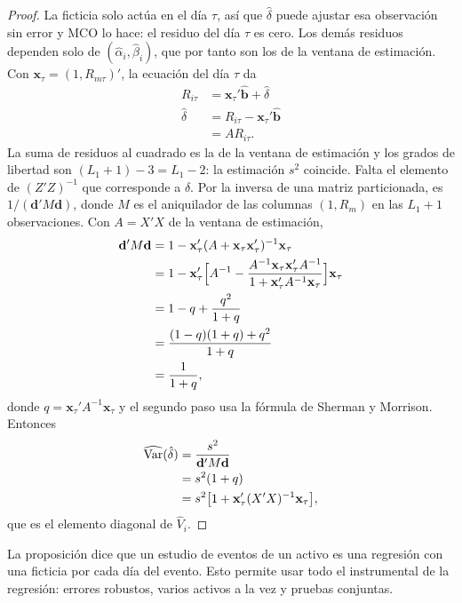 \begin{proof}
La ficticia solo actúa en el día $\tau$, así que $\hat\delta$ puede ajustar esa observación sin error y MCO lo hace: el
residuo del día $\tau$ es cero. Los demás residuos dependen solo de $(\hat\alpha_i,\hat\beta_i)$, que por tanto son los de la ventana
de estimación. Con $\mathbf x_\tau=(1,R_{m\tau})'$, la ecuación del día $\tau$ da
\begin{align*}
  R_{i\tau} &= \mathbf x_\tau'\hat{\mathbf b}+\hat\delta\\
  \hat\delta  &= R_{i\tau}-\mathbf x_\tau'\hat{\mathbf b}\\
             &= AR_{i\tau}.
\end{align*}
La suma de residuos al cuadrado es la de la ventana de estimación y los grados de libertad son $(L_1+1)-3=L_1-2$: la
estimación $s^2$ coincide. Falta el elemento de $(Z'Z)^{-1}$ que corresponde a $\delta$. Por la inversa de una matriz
particionada, es $1/(\mathbf d'M\mathbf d)$, donde $M$ es el aniquilador de las columnas $(1,R_m)$ en las $L_1+1$ observaciones.
Con $A=X'X$ de la ventana de estimación,
\begin{align*}
  \mathbf d'M\mathbf d &= 1-\mathbf x_\tau'(A+\mathbf x_\tau\mathbf x_\tau')^{-1}\mathbf x_\tau\\
                      &= 1-\mathbf x_\tau'\Bigl[A^{-1}-\frac{A^{-1}\mathbf x_\tau\mathbf x_\tau'A^{-1}}{1+\mathbf x_\tau'A^{-1}\mathbf x_\tau}\Bigr]\mathbf x_\tau\\
                      &= 1-q+\frac{q^2}{1+q}\\
                      &= \frac{(1-q)(1+q)+q^2}{1+q}\\
                      &= \frac{1}{1+q},
\end{align*}
donde $q=\mathbf x_\tau'A^{-1}\mathbf x_\tau$ y el segundo paso usa la fórmula de Sherman y Morrison. Entonces
\begin{align*}
  \widehat{\operatorname{Var}}(\hat\delta) &= \frac{s^2}{\mathbf d'M\mathbf d}\\
                           &= s^2(1+q)\\
                           &= s^2\bigl[1+\mathbf x_\tau'(X'X)^{-1}\mathbf x_\tau\bigr],
\end{align*}
que es el elemento diagonal de $\hat V_i$.
\end{proof}

La proposición dice que un estudio de eventos de un activo es una regresión con una ficticia por cada día del evento.
Esto permite usar todo el instrumental de la regresión: errores robustos, varios activos a la vez y pruebas conjuntas.

